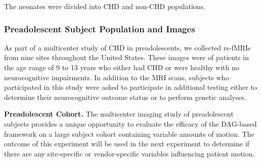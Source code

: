 

The neonates were divided into CHD and non-CHD populations.

\subsubsection{Preadolescent Subject Population and Images}

As part of a multicenter study of CHD in preadolescents, we collected rs-fMRIs from nine sites throughout the United States. These images were of patients in the age range of 9 to 13 years who either had CHD or were healthy with no neurocognitive impairments. In addition to the MRI scans, subjects who participated in this study were asked to participate in additional testing  either to determine their neurocognitive outcome status or to perform genetic analyses. %

\textbf{Preadolescent Cohort.} The multicenter imaging study of preadolescent subjects provides a unique opportunity to evaluate the efficacy of the DAG-based framework on a large subject cohort containing variable amounts of motion. The outcome of this experiment will be used in the next experiment to determine if there are any site-specific or vendor-specific variables influencing patient motion.


